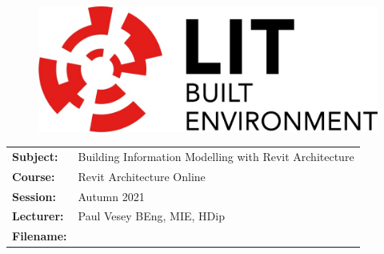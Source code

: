 \documentclass[a4paper, 10pt]{article}
\begin{document}
\lstset{language=HTML,
				basicstyle=\small,
				breaklines=true,
        numbers=left,
        numberstyle=\tiny,
        showstringspaces=false,
        aboveskip=-20pt,
        frame=leftline
        }


\begin{figure}
	\centering
	\includegraphics[width=0.5\linewidth]{./Assignments/img/LITlogo}
\end{figure}


\begin{tabularx}{\textwidth}{ |l|X| }
	\hline
	
	\textbf{Subject:} & Building Information Modelling with Revit Architecture\\
	\textbf{Course:} & Revit Architecture Online\\
	\textbf{Session:} & Autumn 2021\\
	\textbf{Lecturer:} & Paul Vesey \footnotesize{BEng, MIE, HDip}\\
	\textbf{Filename:} & \currfilebase\\
	\hline
\end{tabularx}
\end{document}
